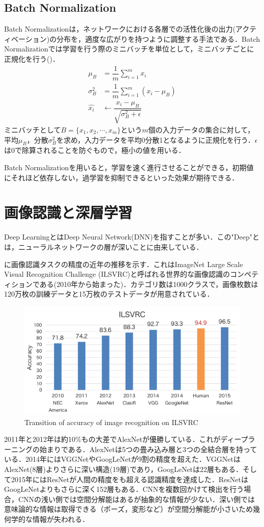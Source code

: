 \subsection*{Batch Normalization}
Batch Normalization\cite{BatchNorm}は，ネットワークにおける各層での活性化後の出力(アクティベーション)の分布を，適度な広がりを持つように調整する手法である．Batch Normalizationでは学習を行う際のミニバッチを単位として，ミニバッチごとに正規化を行う()．
\begin{align}\label{eq:BatchNorm}
	\mu_B & = \dfrac{1}{m}\sum_{i=1}^m x_i \\
	\sigma_B^2 & = \dfrac{1}{m}\sum_{i=1}^m (x_i - \mu_B) \\
	\hat{x_i} & \leftarrow \dfrac{x_i - \mu_B}{\sqrt{\sigma_B^2 + \epsilon}}
\end{align}
ミニバッチとして$B = \{x_1, x_2, \cdots, x_m\}$という$m$個の入力データの集合に対して，平均$\mu_B$，分散$\sigma_B^2$を求め，入力データを平均0分散1となるように正規化を行う．$\epsilon$は0で除算されることを防ぐもので，極小の値を用いる．

Batch Normalizationを用いると，学習を速く進行させることができる，初期値にそれほど依存しない，過学習を抑制できるといった効果が期待できる．


\section{画像認識と深層学習}
Deep LearningとはDeep Neural Network(DNN)を指すことが多い．この"Deep"とは，ニューラルネットワークの層が深いことに由来している．

に画像認識タスクの精度の近年の推移を示す．これはImageNet Large Scale Visual Recognition Challenge (ILSVRC)と呼ばれる世界的な画像認識のコンペティションである(2010年から始まった)．カテゴリ数は1000クラスで，画像枚数は120万枚の訓練データと15万枚のテストデータが用意されている．
\begin{figure}[H]
	\centering
	\includegraphics[width=0.7\linewidth]{figure/Review/ILSVRC}
	\caption{Transition of accuracy of image recognition on ILSVRC}
	\label{fig:ImageNet}
\end{figure}
2011年と2012年は約10\%もの大差でAlexNet\cite{AlexNet}が優勝している．これがディープラーニングの始まりである．AlexNetは5つの畳み込み層と3つの全結合層を持っている．2014年にはVGGNet\cite{VGGNet}やGoogLeNet\cite{GoogLeNet}が9割の精度を超えた．VGGNetはAlexNet(8層)よりさらに深い構造(19層)であり，GoogLeNetは22層もある．そして2015年にはResNet\cite{ResNet}が人間の精度をも超える認識精度を達成した．ResNetはGoogLeNetよりもさらに深く152層もある．CNNを複数回かけて検出を行う場合，CNNの浅い側では空間分解能はあるが抽象的な情報が少ない．深い側では意味論的な情報は取得できる（ポーズ，変形など）が空間分解能が小さいため幾何学的な情報が失われる．


